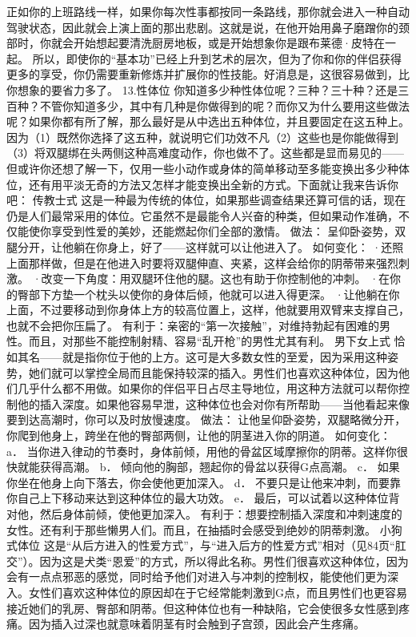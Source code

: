 \documentclass[12pt,UTF8]{ctexbook}
\begin{document}
正如你的上班路线一样，如果你每次性事都按同一条路线，那你就会进入一种自动驾驶状态，因此就会上演上面的那出悲剧。这就是说，在他开始用鼻子磨蹭你的颈部时，你就会开始想起要清洗厨房地板，或是开始想象你是跟布莱德·皮特在一起。
所以，即使你的“基本功”已经上升到艺术的层次，但为了你和你的伴侣获得更多的享受，你仍需要重新修炼并扩展你的性技能。好消息是，这很容易做到，比你想象的要省力多了。
13.性体位
你知道多少种性体位呢？三种？三十种？还是三百种？不管你知道多少，其中有几种是你做得到的呢？而你又为什么要用这些做法呢？如果你都有所了解，那么最好是从中选出五种体位，并且要固定在这五种上。因为（1）既然你选择了这五种，就说明它们功效不凡（2）这些也是你能做得到（3）将双腿绑在头两侧这种高难度动作，你也做不了。这些都是显而易见的——但或许你还想了解一下，仅用一些小动作或身体的简单移动至多能变换出多少种体位，还有用平淡无奇的方法又怎样才能变换出全新的方式。下面就让我来告诉你吧：
传教士式
这是一种最为传统的体位，如果那些调查结果还算可信的话，现在仍是人们最常采用的体位。它虽然不是最能令人兴奋的种类，但如果动作准确，不仅能使你享受到性爱的美妙，还能燃起你们全部的激情。
做法：
呈仰卧姿势，双腿分开，让他躺在你身上，好了——这样就可以让他进入了。
如何变化：
·还照上面那样做，但是在他进入时要将双腿伸直、夹紧，这样会给你的阴蒂带来强烈刺激。
·改变一下角度：用双腿环住他的腿。这也有助于你控制他的冲刺。
·在你的臀部下方垫一个枕头以使你的身体后倾，他就可以进入得更深。
·让他躺在你上面，不过要移动到你身体上方的较高位置上，这样，他就要用双臂来支撑自己，也就不会把你压扁了。
有利于：亲密的“第一次接触”，对维持勃起有困难的男性。而且，对那些不能控制射精、容易“乱开枪”的男性尤其有利。
男下女上式
恰如其名——就是指你位于他的上方。这可是大多数女性的至爱，因为采用这种姿势，她们就可以掌控全局而且能保持较深的插入。男性们也喜欢这种体位，因为他们几乎什么都不用做。如果你的伴侣平日占尽主导地位，用这种方法就可以帮你控制他的插入深度。如果他容易早泄，这种体位也会对你有所帮助——当他看起来像要到达高潮时，你可以及时放慢速度。
做法：
让他呈仰卧姿势，双腿略微分开，你爬到他身上，跨坐在他的臀部两侧，让他的阴茎进入你的阴道。
如何变化：
a． 当你进入律动的节奏时，身体前倾，用他的骨盆区域摩擦你的阴蒂。这样你很快就能获得高潮。
b． 倾向他的胸部，翘起你的骨盆以获得G点高潮。
c． 如果你坐在他身上向下落去，你会使他更加深入。
d． 不要只是让他来冲刺，而要靠你自己上下移动来达到这种体位的最大功效。
e． 最后，可以试着以这种体位背对他，然后身体前倾，使他更加深入。
有利于：想要控制插入深度和冲刺速度的女性。还有利于那些懒男人们。而且，在抽插时会感受到绝妙的阴蒂刺激。
小狗式体位
这是“从后方进入的性爱方式”，与“进入后方的性爱方式”相对（见84页“肛交”）。因为这是犬类“恩爱”的方式，所以得此名称。男性们很喜欢这种体位，因为会有一点点邪恶的感觉，同时给予他们对进入与冲刺的控制权，能使他们更为深入。女性们喜欢这种体位的原因却在于它经常能刺激到G点，而且男性们也更容易接近她们的乳房、臀部和阴蒂。但这种体位也有一种缺陷，它会使很多女性感到疼痛。因为插入过深也就意味着阴茎有时会触到子宫颈，因此会产生疼痛。
\end{document}
